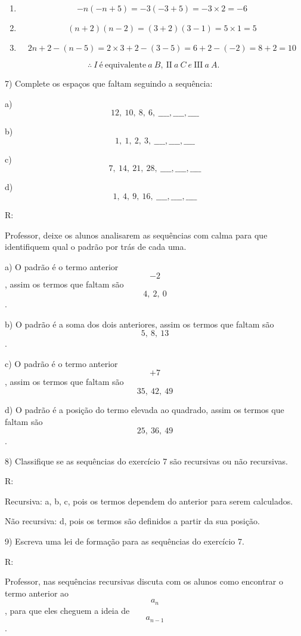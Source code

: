\begin{enumerate}
\def\labelenumi{\Alph{enumi}.}
\item
  \[- n\left( - n + 5 \right) = - 3\left( - 3 + 5 \right) = - 3 \times 2 = - 6\]
\item
  \[\left( n + 2 \right)\left( n - 2 \right) = \left( 3 + 2 \right)\left( 3 - 1 \right) = 5 \times 1 = 5\]
\item
  \[2n + 2 - \left( n - 5 \right) = 2 \times 3 + 2 - \left( 3 - 5 \right) = 6 + 2 - \left( - 2 \right) = 8 + 2 = 10\]
\end{enumerate}

\[\therefore\ I\ é\ \text{equivalente}\ a\ B,\ \text{II}\ a\ C\ e\ \text{III}\ a\ A\text{.\ }\]

7) Complete os espaços que faltam seguindo a sequência:

a) \[12,\ 10,\ 8,\ 6,\ \_\_\_\_,\_\_\_\_,\_\_\_\_\]

b) \[1,\ 1,\ 2,\ 3,\ \_\_\_\_,\_\_\_\_,\_\_\_\_\]

c) \[7,\ 14,\ 21,\ 28,\ \_\_\_\_,\_\_\_\_,\_\_\_\_\]

d) \[1,\ 4,\ 9,\ 16,\ \_\_\_\_,\_\_\_\_,\_\_\_\_\]

R:

Professor, deixe os alunos analisarem as sequências com calma para que
identifiquem qual o padrão por trás de cada uma.

a) O padrão é o termo anterior \[- 2\], assim os termos que faltam são
\[4,\ 2,\ 0\].

b) O padrão é a soma dos dois anteriores, assim os termos que faltam são
\[5,\ 8,\ 13\].

c) O padrão é o termo anterior \[+ 7\], assim os termos que faltam são
\[35,\ 42,\ 49\]

d) O padrão é a posição do termo elevada ao quadrado, assim os termos
que faltam são \[25,\ 36,\ 49\].

8) Classifique se as sequências do exercício 7 são recursivas ou não
recursivas.

R:

Recursiva: a, b, c, pois os termos dependem do anterior para serem
calculados.

Não recursiva: d, pois os termos são definidos a partir da sua posição.

9) Escreva uma lei de formação para as sequências do exercício 7.

R:

Professor, nas sequências recursivas discuta com os alunos como
encontrar o termo anterior ao \[a_{n}\], para que eles cheguem a ideia
de \[a_{n - 1}\].

